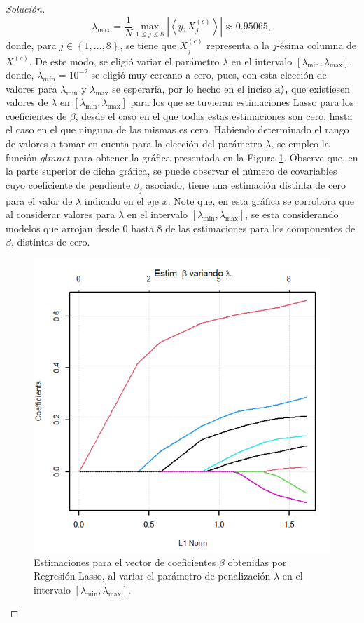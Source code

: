 \documentclass[10.5pt,notitlepage]{article}
\newenvironment{solucion}
  {\begin{proof}[Solución]}
  {\end{proof}}
\newcommand{\abs}[1]{\left\lvert #1 \right\rvert}
\newcommand{\inner}[1]{\left\langle #1 \right\rangle}
\newcommand{\kis}[1]{\left\{ #1 \right\}}
\theoremstyle{plain}
\begin{document}
\begin{solucion}
\[
\lambda_{\max} = \frac{1}{N}\max_{1 \leq j \leq 8}\abs{\inner{y,X^{(c)}_{j}}} \approx 0.95065,
\]
donde, para \(j \in \kis{1, \hdots, 8}\), se tiene que \(X^{(c)}_{j}\) representa a la \(j\)-ésima columna de \(X^{(c)}\). De este modo, se eligió variar el parámetro \(\lambda\) en el intervalo \([\lambda_{\min}, \lambda_{\max}]\), donde, \(\lambda_{min} = 10^{-2}\) se eligió muy cercano a cero, pues, con esta elección de valores para \(\lambda_{\min}\) y \(\lambda_{\max}\) se esperaría, por lo hecho en el inciso \textbf{a),} que existiesen valores de \(\lambda\) en \([\lambda_{\min}, \lambda_{\max}]\) para los que se tuvieran estimaciones Lasso para los coeficientes de \(\beta\), desde el caso en el que todas estas estimaciones son cero, hasta el caso en el que ninguna de las mismas es cero. Habiendo determinado el rango de valores a tomar en cuenta para la elección del parámetro \(\lambda\), se empleo la función \(glmnet\) para obtener la gráfica presentada en la Figura \ref{fig:1}. Observe que, en la parte superior de dicha gráfica, se puede observar el número de covariables cuyo coeficiente de pendiente \(\beta_j\) asociado, tiene una estimación distinta de cero para el valor de \(\lambda\) indicado en el eje \(x\). Note que, en esta gráfica se corrobora que al considerar valores para \(\lambda\) en el intervalo \([\lambda_{\min}, \lambda_{\max}]\), se esta considerando modelos que arrojan desde \(0\) hasta \(8\) de las estimaciones para los componentes de \(\beta\), distintas de cero. 
\begin{figure}[htb]
    \centering
    \includegraphics[scale = 0.4]{Esims.png}
    \caption{Estimaciones para el vector de coeficientes \(\beta\) obtenidas por Regresión Lasso, al variar el parámetro de penalización \(\lambda\) en el intervalo \([\lambda_{\min},\lambda_{\max}]\).}
    \label{fig:1}
\end{figure}


\end{solucion}
\end{document}
